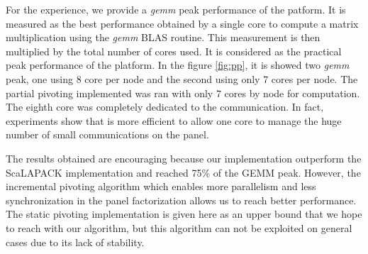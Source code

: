 For the experience, we provide a \emph{gemm} peak performance of the patform. It is measured as the best performance obtained by a single core to compute a matrix multiplication using the \emph{gemm} BLAS routine. This measurement is then multiplied by the total number of cores used. It is considered as the practical peak performance of the platform. In the figure \ref{fig:pp}, it is showed two \emph{gemm} peak, one using 8 core per node and the second using only 7 cores per node.
The partial pivoting implemented was ran with only 7 cores by node for computation. The eighth core was completely dedicated to the communication. In fact, experiments show that is more efficient to allow one core to manage the huge number of small communications on the panel. 

The results obtained are encouraging  because our implementation outperform the ScaLAPACK implementation and reached 75\% of the GEMM peak.
However, the incremental pivoting algorithm which enables more parallelism and less synchronization in the panel factorization allows us to reach better performance.
The static pivoting implementation is given here as an upper bound that we hope to reach with our algorithm, but this algorithm can not be exploited on general cases due to its lack of stability. 



